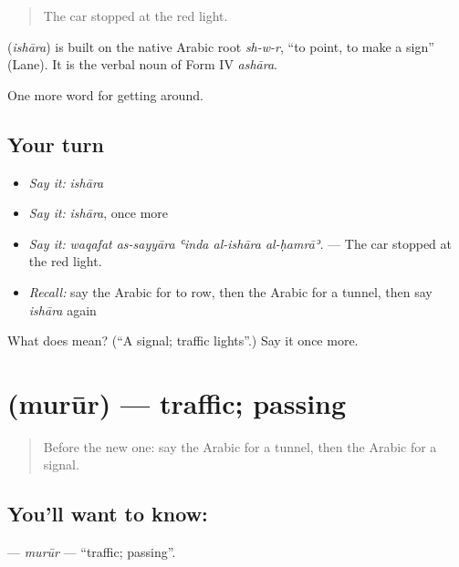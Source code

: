 \begin{quote}
The car stopped at the red light.
\end{quote}

\begin{cousinweb}
\textbf{} (\emph{ishāra}) is built on the native Arabic root \emph{sh-w-r}, \textquotedblleft{}to point, to make a sign\textquotedblright{} (Lane). It is the verbal noun of Form IV \emph{ashāra}.
\end{cousinweb}

\begin{grammarlens}[title={What you've built}]
One more word for getting around.
\end{grammarlens}

\subsection*{Your turn}
\begin{itemize}
\raggedright
  \item \emph{Say it:} \emph{ishāra}
  \item \emph{Say it:} \emph{ishāra}, once more
  \item \emph{Say it:} \emph{waqafat as-sayyāra ʿinda al-ishāra al-ḥamrāʾ.} — The car stopped at the red light.
  \item \emph{Recall:} say the Arabic for to row, then the Arabic for a tunnel, then say \emph{ishāra} again
\end{itemize}

\begin{tcolorbox}[breakable,colback=teal!4,colframe=teal!35!black,title={Before you move on}]
What does  mean? (\textquotedblleft{}A signal; traffic lights\textquotedblright{}.) Say it once more.
\end{tcolorbox}
\section[\texorpdfstring{\ar{مرور} (murūr)}{مرور (murūr)}]{ (murūr) — traffic; passing}

\label{lesson:AR-C431-murur}



\begin{quote}
Before the new one: say the Arabic for a tunnel, then the Arabic for a signal.
\end{quote}

\subsection*{You'll want to know: }
\textbf{} — \emph{murūr} — \textquotedblleft{}traffic; passing\textquotedblright{}.

